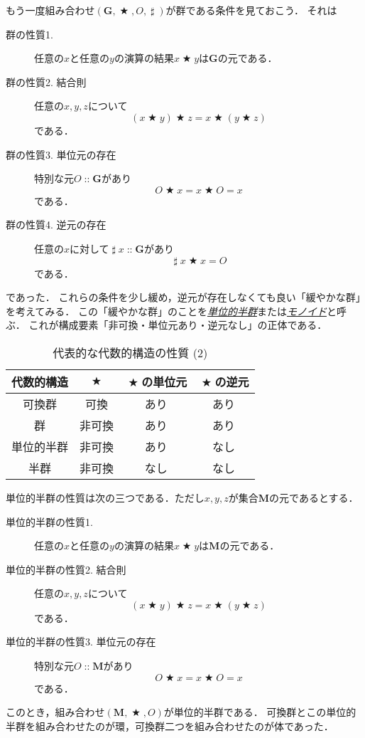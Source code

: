 \documentclass[twocolumn]{jsbook}
\newcommand{\keyword}[1]{\underline{\emph{#1}}}
\DeclareMathOperator{\mathAnyBinaryOperator}{\bigstar}
\DeclareMathOperator{\mathInverse}{\sharp}
\DeclareMathOperator{\mathIn}{::}
\newcommand{\mathSet}[1]{\mathbf{#1}}
\newcommand{\mathMonoid}[3]{(#1,#2,#3)}
\newcommand{\mathGroup}[4]{(#1,#2,#3,#4)}
\begin{document}
もう一度組み合わせ$\mathGroup{\mathSet{G}}{\mathAnyBinaryOperator}{O}{\mathInverse}$が群である条件を見ておこう．
それは
\begin{description}
\item[群の性質1.] 任意の$x$と任意の$y$の演算の結果$x\mathAnyBinaryOperator y$は$\mathSet{G}$の元である．
\item[群の性質2. 結合則] 任意の$x,y,z$について$$(x\mathAnyBinaryOperator y)\mathAnyBinaryOperator z=x\mathAnyBinaryOperator(y\mathAnyBinaryOperator z)$$である．
\item[群の性質3. 単位元の存在] 特別な元$O\mathIn\mathSet{G}$があり$$O\mathAnyBinaryOperator x=x\mathAnyBinaryOperator O=x$$である．
\item[群の性質4. 逆元の存在] 任意の$x$に対して$\mathInverse x\mathIn\mathSet{G}$があり$$\mathInverse x\mathAnyBinaryOperator x=O$$である．
\end{description}
であった．
これらの条件を少し緩め，逆元が存在しなくても良い「緩やかな群」を考えてみる．
この「緩やかな群」のことを\keyword{単位的半群}または\keyword{モノイド}と呼ぶ．
これが構成要素「非可換・単位元あり・逆元なし」の正体である．

\begin{table}
\caption{代表的な代数的構造の性質 (2)}
\label{tab:group-and-monoid}
\begin{center}
\begin{tabular}{||c||c|c|c||}
\hline
代数的構造&$\mathAnyBinaryOperator$&$\mathAnyBinaryOperator$の単位元&$\mathAnyBinaryOperator$の逆元\\
\hline\hline
可換群&可換&あり&あり\\
群&非可換&あり&あり\\
単位的半群&非可換&あり&なし\\
半群&非可換&なし&なし\\
\hline
\end{tabular}
\end{center}
\end{table}

単位的半群の性質は次の三つである．ただし$x,y,z$が集合$\mathSet{M}$の元であるとする．
\begin{description}
\item[単位的半群の性質1.] 任意の$x$と任意の$y$の演算の結果$x\mathAnyBinaryOperator y$は$\mathSet{M}$の元である．
\item[単位的半群の性質2. 結合則] 任意の$x,y,z$について$$(x\mathAnyBinaryOperator y)\mathAnyBinaryOperator z=x\mathAnyBinaryOperator(y\mathAnyBinaryOperator z)$$である．
\item[単位的半群の性質3. 単位元の存在] 特別な元$O\mathIn\mathSet{M}$があり$$O\mathAnyBinaryOperator x=x\mathAnyBinaryOperator O=x$$である．
\end{description}
このとき，組み合わせ$\mathMonoid{\mathSet{M}}{\mathAnyBinaryOperator}{O}$が単位的半群である．
可換群とこの単位的半群を組み合わせたのが環，可換群二つを組み合わせたのが体であった．
\end{document}
